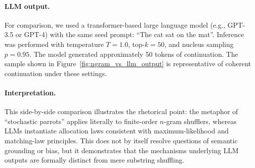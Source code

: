\documentclass[11pt]{article}
\begin{document}
\paragraph{LLM output.}
For comparison, we used a transformer-based large language model (e.g., GPT-3.5
or GPT-4) with the same seed prompt: ``The cat sat on the mat''. Inference was
performed with temperature $T{=}1.0$, top-$k{=}50$, and nucleus sampling
$p{=}0.95$. The model generated approximately 50 tokens of continuation. The
sample shown in Figure~\ref{fig:ngram_vs_llm_output} is representative of
coherent continuation under these settings.

\paragraph{Interpretation.}
This side-by-side comparison illustrates the rhetorical point: the metaphor of
``stochastic parrots'' applies literally to finite-order $n$-gram shufflers,
whereas LLMs instantiate allocation laws consistent with maximum-likelihood and
matching-law principles. This does not by itself resolve questions of semantic
grounding or bias, but it demonstrates that the mechanisms underlying LLM
outputs are formally distinct from mere substring shuffling.
\end{document}
